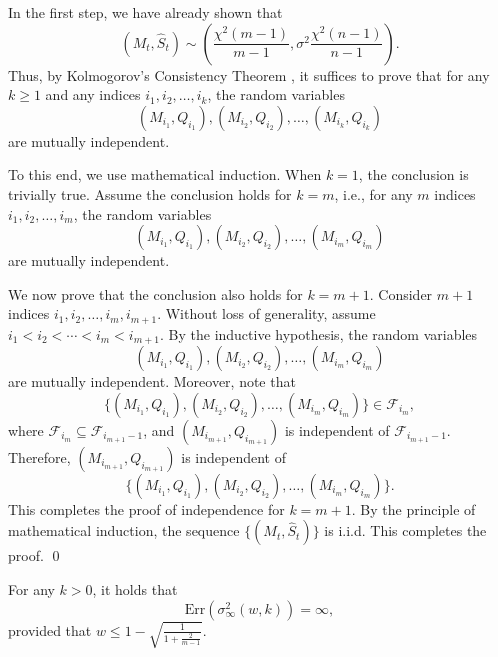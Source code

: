 In the first step, we have already shown that 
\[
(M_t, \widehat{S}_t) \sim \left(\frac{\chi^2(m-1)}{m-1}, \sigma^2\frac{\chi^2(n-1)}{n-1}\right).
\]
Thus, by Kolmogorov’s Consistency Theorem \citep{khoshnevisan2006multiparameter}, it suffices to prove that for any \(k \geq 1\) and any indices \(i_1, i_2, \ldots, i_k\), the random variables 
\[
(M_{i_1}, Q_{i_1}), (M_{i_2}, Q_{i_2}), \ldots, (M_{i_k}, Q_{i_k})
\]
are mutually independent. 


To this end, we use mathematical induction. When \(k = 1\), the conclusion is trivially true. Assume the conclusion holds for \(k = m\), i.e., for any \(m\) indices \(i_1, i_2, \ldots, i_m\), the random variables 
\[
(M_{i_1}, Q_{i_1}), (M_{i_2}, Q_{i_2}), \ldots, (M_{i_m}, Q_{i_m})
\]
are mutually independent. 


We now prove that the conclusion also holds for \(k = m+1\). Consider \(m+1\) indices \(i_1, i_2, \ldots, i_m, i_{m+1}\). Without loss of generality, assume \(i_1 < i_2 < \cdots < i_m < i_{m+1}\). By the inductive hypothesis, the random variables 
\[
(M_{i_1}, Q_{i_1}), (M_{i_2}, Q_{i_2}), \ldots, (M_{i_m}, Q_{i_m})
\]
are mutually independent. Moreover, note that 
\[
\{(M_{i_1}, Q_{i_1}), (M_{i_2}, Q_{i_2}), \ldots, (M_{i_m}, Q_{i_m})\} \in \mathcal{F}_{i_m},
\]
where \(\mathcal{F}_{i_m} \subseteq \mathcal{F}_{i_{m+1}-1}\), and \((M_{i_{m+1}}, Q_{i_{m+1}})\) is independent of \(\mathcal{F}_{i_{m+1}-1}\). Therefore, \((M_{i_{m+1}}, Q_{i_{m+1}})\) is independent of 
\[
\{(M_{i_1}, Q_{i_1}), (M_{i_2}, Q_{i_2}), \ldots, (M_{i_m}, Q_{i_m})\}.
\]
This completes the proof of independence for \(k = m+1\). By the principle of mathematical induction, the sequence \(\{(M_t, \widehat{S}_t)\}\) is i.i.d. This completes the proof. \qed \\

\begin{lemma}
\label{infinity_var_lemma_uni}
For any $k>0$, it holds that 
\begin{equation*}
\mathrm{Err}(\sigma_{\infty}^2(w,k)) = \infty,
\end{equation*}
provided that $w \leq 1 - \sqrt{\frac{1}{1 + \frac{2}{m-1}}}$.
\end{lemma}


